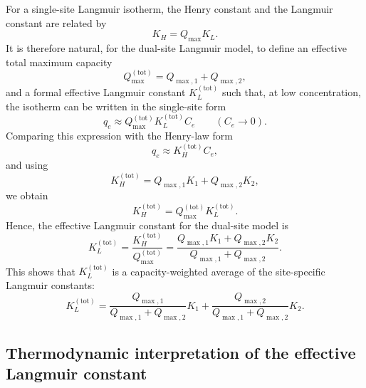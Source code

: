 	For a single-site Langmuir isotherm, the Henry constant and the
	Langmuir constant are related by
	\begin{equation}
		K_H = Q_{\max} K_L.
	\end{equation}
	It is therefore natural, for the dual-site Langmuir model, to define
	an effective total maximum capacity
	\begin{equation}
		Q_{\max}^{\mathrm{(tot)}} = Q_{\max,1} + Q_{\max,2},
	\end{equation}
	and a formal effective Langmuir constant \(K_L^{\mathrm{(tot)}}\)
	such that, at low concentration, the isotherm can be written in the
	single-site form
	\begin{equation}
		q_e \approx Q_{\max}^{\mathrm{(tot)}} K_L^{\mathrm{(tot)}} C_e
		\qquad (C_e \to 0).
	\end{equation}
	Comparing this expression with the Henry-law form
	\begin{equation}
		q_e \approx K_H^{\mathrm{(tot)}} C_e,
	\end{equation}
	and using
	\begin{equation}
		K_H^{\mathrm{(tot)}} = Q_{\max,1} K_1 + Q_{\max,2} K_2,
	\end{equation}
	we obtain
	\begin{equation}
		K_H^{\mathrm{(tot)}} = Q_{\max}^{\mathrm{(tot)}} K_L^{\mathrm{(tot)}}.
	\end{equation}
	Hence, the effective Langmuir constant for the dual-site model is
	\begin{equation}
		K_L^{\mathrm{(tot)}}
		= \frac{K_H^{\mathrm{(tot)}}}{Q_{\max}^{\mathrm{(tot)}}}
		= \frac{Q_{\max,1} K_1 + Q_{\max,2} K_2}
		{Q_{\max,1} + Q_{\max,2}}.
	\end{equation}
	This shows that \(K_L^{\mathrm{(tot)}}\) is a capacity-weighted
	average of the site-specific Langmuir constants:
	\begin{equation}
		\boxed{
			K_L^{\mathrm{(tot)}}
			= \frac{Q_{\max,1}}{Q_{\max,1} + Q_{\max,2}} K_1
			+ \frac{Q_{\max,2}}{Q_{\max,1} + Q_{\max,2}} K_2.
		}
	\end{equation}
	
	\subsection{Thermodynamic interpretation of the effective Langmuir constant}
	
